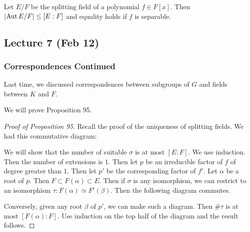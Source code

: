 \documentclass[10pt, twoside]{article}
\begin{document}
    \begin{prop}
        Let $E/F$ be the splitting field of a polynomial $f \in F[x]$. Then $\abs*{\Aut{E/F}} \leq [E:F]$ and equality holds if $f$ is separable.
    \end{prop}

    \subsection{Lecture 7 (Feb 12)}

    \subsubsection{Correspondences Continued}
    Last time, we discussed correspondences between subgroups of $G$ and fields between $K$ and $F$.

    We will prove Proposition 95.
    \begin{proof}[Proof of Proposition 95]
        Recall the proof of the uniqueness of splitting fields. We had this commutative diagram:
        \begin{center}
        \end{center}
        We will show that the number of suitable $\sigma$ is at most $[E:F]$. We use induction. Then the number of extensions is $1$. Then let $p$ be an irreducible factor of $f$ of degree greater than $1$. Then let $p'$ be the corresponding factor of $f'$. Let $\alpha$ be a root of $p$. Then $F \subset F(\alpha) \subset E$. Then if $\sigma$ is any isomorphism, we can restrict to an isomorphism $\tau:F(\alpha) \simeq F'(\beta)$. Then the following diagram commutes.
        \begin{center}
        \end{center}
        Conversely, given any root $\beta$ of $p'$, we can make such a diagram. Then $\# \tau$ is at most $[F(\alpha):F]$. Use induction on the top half of the diagram and the result follows. 
    \end{proof}
\end{document}
